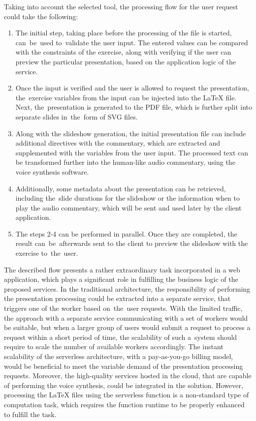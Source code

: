Taking into account the selected tool, the processing flow for the user request could take the following:

\begin{enumerate}
   \item The initial step, taking place before the processing of the file is started, can~be~used to~validate the user input. The entered values can be compared with the constraints of the exercise, along with verifying if the user can preview the particular presentation, based on the application logic of the service.
   \item Once the input is verified and the user is allowed to request the presentation, the~exercise variables from the input can be injected into the LaTeX file. 
   Next, the~presentation is generated to the PDF file, which is further split into separate slides in~the~form of SVG files.
   \item Along with the slideshow generation, the initial presentation file can include additional directives with the commentary, which are extracted and supplemented with the variables from the user input. The processed text can be transformed further into the human-like audio commentary, using the voice synthesis software.
   \item Additionally, some metadata about the presentation can be retrieved, including the~slide durations for the slideshow or the information when to play the audio commentary, which will be sent and used later by the client application.
   \item The steps 2-4 can be performed in parallel. Once they are completed, the result can~be~afterwards sent to the client to preview the slideshow with the exercise to~the~user.
\end{enumerate}

The described flow presents a rather extraordinary task incorporated in a web application, which plays a significant role in fulfilling the business logic of the proposed services.
In the traditional architecture, the responsibility of performing the presentation processing could be extracted into a separate service, that triggers one of the worker based on~the~user requests.
With the limited traffic, the approach with a separate service communicating with a set of workers would be suitable, but when a larger group of users would submit a request to process a request within a short period of time, the scalability of such a~system should require to scale the number of available workers accordingly.
The instant scalability of the serverless architecture, with a pay-as-you-go billing model, would be beneficial to meet the variable demand of the presentation processing requests.
Moreover, the high-quality services hosted in the cloud, that are capable of performing the voice synthesis, could be integrated in the solution.
However, processing the LaTeX files using the serverless function is a non-standard type of computation task, which requires the function runtime to be properly enhanced to fulfill the task.

